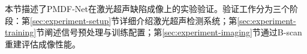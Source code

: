 本节描述了PMDF-Net在激光超声缺陷成像上的实验验证。验证工作分为三个阶段：第\ref{sec:experiment-setup}节详细介绍激光超声检测系统；第\ref{sec:experiment-training}节阐述信号预处理与训练配置；第\ref{sec:experiment-imaging}节通过B-scan重建评估成像性能。

